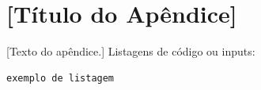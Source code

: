\chapter{[Título do Apêndice]}
\label{ap:modelo}

[Texto do apêndice.] Listagens de código ou inputs:

\begin{lstlisting}
exemplo de listagem
\end{lstlisting}
